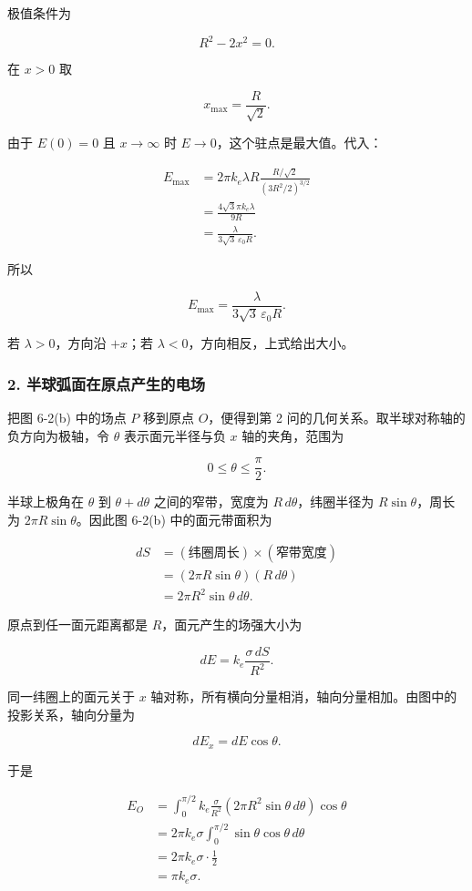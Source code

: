 \documentclass[12pt,a4paper,UTF8]{ctexart}
\begin{document}
极值条件为

\[
R^2-2x^2=0.
\]

在 \(x>0\) 取

\[
\boxed{x_{\max}=\frac{R}{\sqrt2}}.
\]

由于 \(E(0)=0\) 且 \(x\to\infty\) 时 \(E\to0\)，这个驻点是最大值。代入：

\[
\begin{aligned}
E_{\max}
&=2\pi k_e\lambda R
\frac{R/\sqrt2}{(3R^2/2)^{3/2}}\\
&=\frac{4\sqrt3\pi k_e\lambda}{9R}\\
&=\frac{\lambda}{3\sqrt3\,\varepsilon_0R}.
\end{aligned}
\]

所以

\[
\boxed{E_{\max}=\frac{\lambda}{3\sqrt3\,\varepsilon_0R}}.
\]

若 \(\lambda>0\)，方向沿 \(+x\)；若
\(\lambda<0\)，方向相反，上式给出大小。

\subsubsection{2.
半球弧面在原点产生的电场}\label{ux534aux7403ux5f27ux9762ux5728ux539fux70b9ux4ea7ux751fux7684ux7535ux573a}

把图 6-2(b) 中的场点 \(P\) 移到原点 \(O\)，便得到第 2
问的几何关系。取半球对称轴的负方向为极轴，令 \(\theta\) 表示面元半径与负
\(x\) 轴的夹角，范围为

\[
0\le\theta\le\frac{\pi}{2}.
\]

半球上极角在 \(\theta\) 到 \(\theta+d\theta\) 之间的窄带，宽度为
\(R\,d\theta\)，纬圈半径为 \(R\sin\theta\)，周长为
\(2\pi R\sin\theta\)。因此图 6-2(b) 中的面元带面积为

\[
\begin{aligned}
dS
&=(\text{纬圈周长})\times(\text{窄带宽度})\\
&=(2\pi R\sin\theta)(R\,d\theta)\\
&=2\pi R^2\sin\theta\,d\theta.
\end{aligned}
\]

原点到任一面元距离都是 \(R\)，面元产生的场强大小为

\[
dE=k_e\frac{\sigma\,dS}{R^2}.
\]

同一纬圈上的面元关于 \(x\)
轴对称，所有横向分量相消，轴向分量相加。由图中的投影关系，轴向分量为

\[
dE_x=dE\cos\theta.
\]

于是

\[
\begin{aligned}
E_O
&=\int_0^{\pi/2}k_e\frac{\sigma}{R^2}
\left(2\pi R^2\sin\theta\,d\theta\right)\cos\theta\\
&=2\pi k_e\sigma\int_0^{\pi/2}\sin\theta\cos\theta\,d\theta\\
&=2\pi k_e\sigma\cdot\frac12\\
&=\pi k_e\sigma.
\end{aligned}
\]
\end{document}

